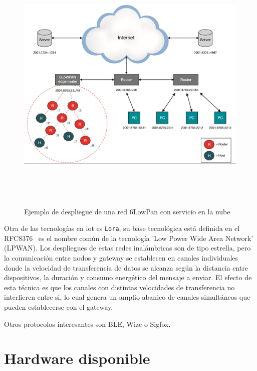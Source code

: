 \begin{figure}[hbt!]
\centering
\label{6Lowpandeploy}
\includegraphics[height=5in]{figures/6LowPanDeploy.png}
\caption[Ejemplo de despliegue de una red 6LowPan con servicio en la nube]{Ejemplo de despliegue de una red 6LowPan con servicio en la nube}
\end{figure}

Otra de las tecnologías en {iot} es \verb|Lora|, su base tecnológica está definida en el RFC8376~\cite{rfc8376} es el nombre común de la tecnología 'Low Power Wide Area Network' (LPWAN). Los despliegues de estas redes inalámbricas son de tipo estrella, pero la comunicación entre nodos y \gls{gateway} se establecen en canales individuales donde la velocidad de transferencia de datos se alcanza según la distancia entre dispositivos, la duración y consumo energético del mensaje a enviar. El efecto de esta técnica es que los canales con distintas velocidades de transferencia no interfieren entre si, lo cual genera un amplio abanico de canales simultáneos que pueden establecerse con el \gls{gateway}.

Otros protocolos interesantes son BLE, Wize o Sigfox.


\section{Hardware disponible}
\label{ch:Capitulo2.4}

